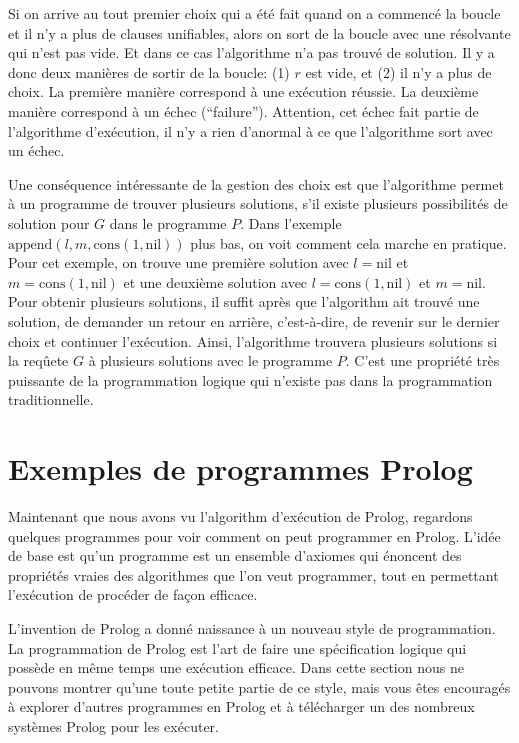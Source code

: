 Si on arrive au tout premier choix qui a été fait quand on a commencé la boucle et il n'y a plus de clauses unifiables,
alors on sort de la boucle avec une résolvante qui n'est pas vide. Et dans ce cas l'algorithme n'a pas trouvé de solution. 
Il y a donc deux manières de sortir de la boucle: (1) $r$ est vide, et (2) il n'y a plus de choix.
La première manière correspond à une exécution réussie.
La deuxième manière correspond à un échec (``failure'').
Attention, cet échec fait partie de l'algorithme d'exécution, il n'y a rien d'anormal à ce que l'algorithme sort avec un échec.

Une conséquence intéressante de la gestion des choix est que
l'algorithme permet à un programme de trouver plusieurs solutions, s'il existe plusieurs possibilités
de solution pour $G$ dans le programme $P$.
Dans l'exemple $\mathrm{append}(l,m,\mathrm{cons}(1,\mathrm{nil}))$ plus bas,
on voit comment cela marche en pratique.
Pour cet exemple, on trouve une première solution avec $l=\mathrm{nil}$ et $m=\mathrm{cons}(1,\mathrm{nil})$ et une deuxième solution
avec $l=\mathrm{cons}(1,\mathrm{nil})$ et $m=\mathrm{nil}$.
Pour obtenir plusieurs solutions, il suffit après que l'algorithm ait trouvé une solution,
de demander un retour en arrière, c'est-à-dire, de revenir sur le dernier choix et continuer l'exécution.
Ainsi, l'algorithme trouvera plusieurs solutions si la reqûete $G$ à plusieurs solutions avec le programme $P$.
C'est une propriété très puissante de la programmation logique qui n'existe pas dans la programmation traditionnelle.


\section{Exemples de programmes Prolog}

Maintenant que nous avons vu l'algorithm d'exécution de Prolog,
regardons quelques programmes pour voir comment on peut programmer en Prolog.
L'idée de base est qu'un programme est un ensemble d'axiomes qui énoncent des propriétés vraies
des algorithmes que l'on veut programmer, tout en permettant l'exécution de procéder de façon efficace.

L'invention de Prolog a donné naissance à un nouveau style de programmation.
La programmation de Prolog est l'art de faire une spécification logique qui possède en même temps une exécution efficace.
Dans cette section nous ne pouvons montrer qu'une toute petite partie de ce style,
mais vous êtes encouragés à explorer d'autres programmes en Prolog et à télécharger
un des nombreux systèmes Prolog pour les exécuter.

